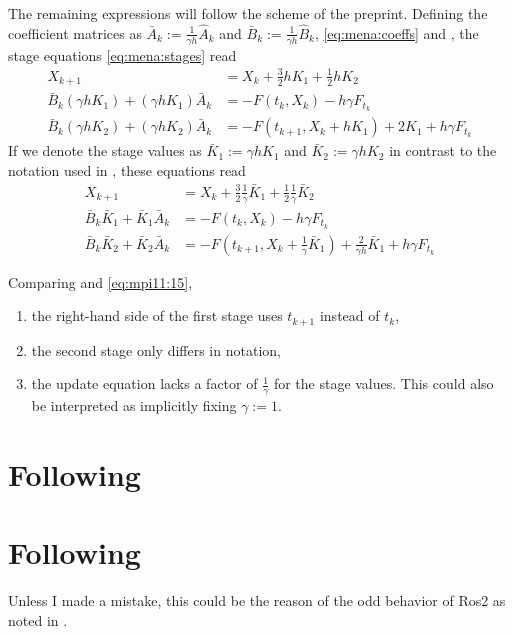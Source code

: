 The remaining expressions will follow the scheme of the preprint.
Defining the coefficient matrices as
$\bar{A}_k := \frac{1}{\gamma h} \hat{A}_k$ and
$\bar{B}_k := \frac{1}{\gamma h} \hat{B}_k$,
\cf \eqref{eq:mena:coeffs} and \cite[7]{MPIMD11-06},
the stage equations \eqref{eq:mena:stages} read
\begin{subequations}
\begin{align}
  X_{k+1} &= X_k + \tfrac{3}{2} h K_1 + \tfrac{1}{2} h K_2 \\
  \bar{B}_k (\gamma h K_1) + (\gamma h K_1) \bar{A}_k &= -F(t_k, X_k) - h\gamma F_{t_k} \\
  \bar{B}_k (\gamma h K_2) + (\gamma h K_2) \bar{A}_k &= -F(t_{k+1}, X_k + hK_1) + 2K_1 + h\gamma F_{t_k}
\end{align}
\end{subequations}
If we denote the stage values as $\bar{K}_1 := \gamma h K_1$ and $\bar{K}_2 := \gamma h K_2$
in contrast to the notation used in \cite{MPIMD11-06},
these equations read
\begin{subequations}\label{eq:mpi11:15}
\begin{align}
  X_{k+1} &= X_k + \tfrac{3}{2} \tfrac{1}{\gamma} \bar{K}_1 + \tfrac{1}{2} \tfrac{1}{\gamma} \bar{K}_2 \\
  \bar{B}_k \bar{K}_1 + \bar{K}_1 \bar{A}_k &= -F(t_k, X_k) - h\gamma F_{t_k} \\
  \bar{B}_k \bar{K}_2 + \bar{K}_2 \bar{A}_k &= -F(t_{k+1}, X_k + \tfrac{1}{\gamma}\bar{K}_1) + \tfrac{2}{\gamma h}\bar{K}_1 + h\gamma F_{t_k}
\end{align}
\end{subequations}

Comparing \cite[Equation (15)]{MPIMD11-06} and \eqref{eq:mpi11:15},
\begin{enumerate}
  \item
    the right-hand side of the first stage uses $t_{k+1}$ instead of $t_k$,
  \item
    the second stage only differs in notation,
  \item
    the update equation lacks a factor of $\frac{1}{\gamma}$ for the stage values.
    This could also be interpreted as implicitly fixing $\gamma := 1$.
\end{enumerate}


\section{Following \cite{MPIMD12-13}}

\section{Following \cite{Lang2015}}

Unless I made a mistake, this could be the reason of the odd behavior of Ros2 as noted in \cite[63]{Lang2015}.
